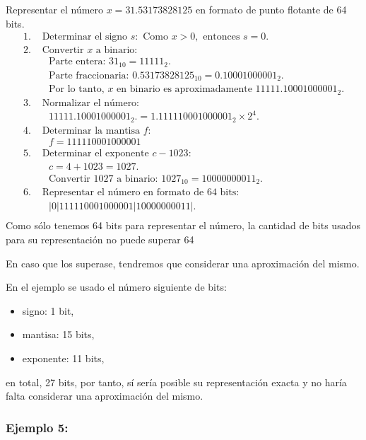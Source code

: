 \documentclass[
]{article}
\providecommand{\tightlist}{%
  \setlength{\itemsep}{0pt}\setlength{\parskip}{0pt}}
\begin{document}
Representar el número \(x=31.53173828125\) en formato de punto flotante
de 64 bits. \[
\begin{align*}
1. & \text{ Determinar el signo } s: \text{ Como } x > 0, \text{ entonces } s = 0. \\
2. & \text{ Convertir } x \text{ a binario: } \\
   & \quad \text{Parte entera: } 31_{10} = 11111_2. \\
   & \quad \text{Parte fraccionaria: } 0.53173828125_{10} = 0.10001000001_2. \\
   & \quad \text{Por lo tanto, } x \text{ en binario es aproximadamente } 11111.10001000001_2. \\
3. & \text{ Normalizar el número: } \\
   & \quad 11111.10001000001_2. = 1.111110001000001_2 \times 2^4. \\
4. & \text{ Determinar la mantisa } f: \\
   & \quad f = 111110001000001 \\
5. & \text{ Determinar el exponente } c - 1023: \\
   & \quad c = 4 + 1023 = 1027. \\
   & \quad \text{Convertir } 1027 \text{ a binario: } 1027_{10} = 10000000011_2. \\
6. & \text{ Representar el número en formato de 64 bits: } \\
   & \quad |0|111110001000001|10000000011|. \\
\end{align*}
\] Como sólo tenemos 64 bits para representar el número, la cantidad de
bits usados para su representación no puede superar 64

En caso que los superase, tendremos que considerar una aproximación del
mismo.

En el ejemplo se usado el número siguiente de bits:

\begin{itemize}
\tightlist
\item
  signo: 1 bit,
\item
  mantisa: 15 bits,
\item
  exponente: 11 bits,
\end{itemize}

en total, 27 bits, por tanto, sí sería posible su representación exacta
y no haría falta considerar una aproximación del mismo.

\subsubsection{Ejemplo 5:}\label{ejemplo-5}
\end{document}
